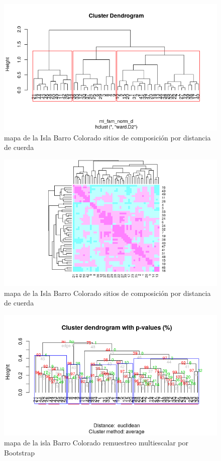 \documentclass[11pt,]{article}
\begin{document}
\begin{figure}
\centering
\includegraphics[width=1.00000\textwidth]{agrupamiento_dendrograma.png}
\caption{mapa de la Isla Barro Colorado sitios de composición por
distancia de cuerda \label{fig:bci_map}}
\end{figure}

\begin{figure}
\centering
\includegraphics[width=1.00000\textwidth]{comparacion_dendrograma_mapa_calor.png}
\caption{mapa de la Isla Barro Colorado sitios de composición por
distancia de cuerda \label{fig:bci_map}}
\end{figure}

\begin{figure}
\centering
\includegraphics[width=1.00000\textwidth]{multiescalar_bootstrap.png}
\caption{mapa de la isla Barro Colorado remuestreo multiescalar por
Bootstrap \label{fig:bci_map}}
\end{figure}
\end{document}
